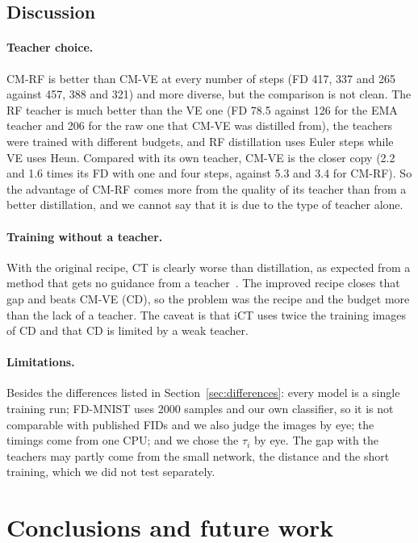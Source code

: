 \documentclass{article}
\begin{document}
\subsection{Discussion}

\paragraph{Teacher choice.} CM-RF is better than CM-VE at every number of steps
(FD 417, 337 and 265 against 457, 388 and 321) and more diverse, but the
comparison is not clean. The RF teacher is much better than the VE one (FD 78.5
against 126 for the EMA teacher and 206 for the raw one that CM-VE was distilled
from), the teachers were trained with different budgets, and RF distillation uses
Euler steps while VE uses Heun. Compared with its own teacher, CM-VE is the closer
copy (2.2 and 1.6 times its FD with one and four steps, against 5.3 and 3.4 for
CM-RF). So the advantage of CM-RF comes more from the quality of its teacher than
from a better distillation, and we cannot say that it is due to the type of
teacher alone.

\paragraph{Training without a teacher.} With the original recipe, CT is clearly
worse than distillation, as expected from a method that gets no guidance from a
teacher~\cite{song2023consistency,song2024improved}. The improved recipe closes
that gap and beats CM-VE (CD), so the problem was the recipe and the budget more
than the lack of a teacher. The caveat is that iCT uses twice the training images
of CD and that CD is limited by a weak teacher.

\paragraph{Limitations.} Besides the differences listed in
Section~\ref{sec:differences}: every model is a single training run; FD-MNIST
uses 2000 samples and our own classifier, so it is not comparable with published
FIDs and we also judge the images by eye; the timings come from one CPU; and we
chose the $\tau_i$ by eye. The gap with the teachers may partly come from the
small network, the distance and the short training, which we did not test
separately.

\section{Conclusions and future work}
\label{sec:conclusions}
\end{document}
